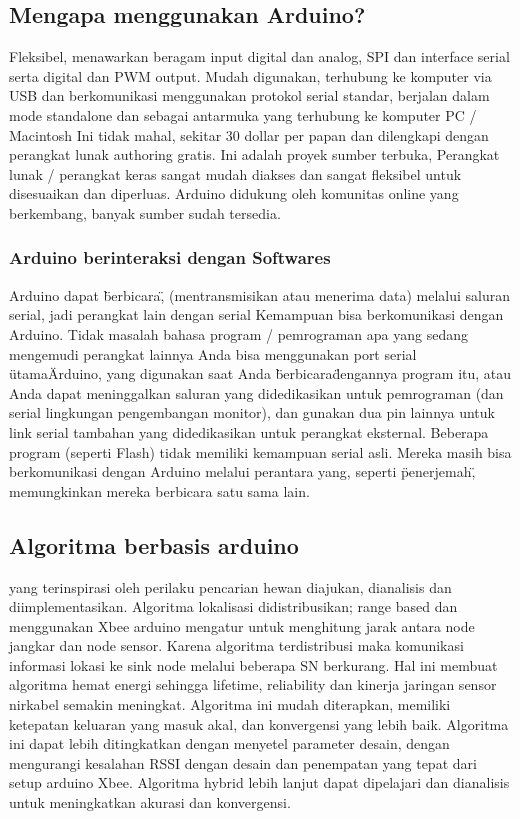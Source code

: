 \subsection{Mengapa menggunakan Arduino?}
Fleksibel, menawarkan beragam input digital dan analog, SPI dan interface serial serta digital dan PWM
output. Mudah digunakan, terhubung ke komputer via USB dan berkomunikasi menggunakan protokol serial standar, berjalan
dalam mode standalone dan sebagai antarmuka yang terhubung ke komputer PC / Macintosh
Ini tidak mahal, sekitar 30 dollar per papan dan dilengkapi dengan perangkat lunak authoring gratis. Ini adalah proyek sumber terbuka,
Perangkat lunak / perangkat keras sangat mudah diakses dan sangat fleksibel untuk disesuaikan dan diperluas. Arduino didukung
oleh komunitas online yang berkembang, banyak sumber sudah tersedia.

\subsubsection{Arduino berinteraksi dengan Softwares}
Arduino dapat \"berbicara\", (mentransmisikan atau menerima data) melalui saluran serial, jadi perangkat lain dengan serial
Kemampuan bisa berkomunikasi dengan Arduino. Tidak masalah bahasa program / pemrograman apa yang sedang mengemudi
perangkat lainnya Anda bisa menggunakan port serial \"utama\" Arduino, yang digunakan saat Anda \"berbicara\" dengannya
program itu, atau Anda dapat meninggalkan saluran yang didedikasikan untuk pemrograman (dan serial lingkungan pengembangan
monitor), dan gunakan dua pin lainnya untuk link serial tambahan yang didedikasikan untuk perangkat eksternal. Beberapa program (seperti
Flash) tidak memiliki kemampuan serial asli. Mereka masih bisa berkomunikasi dengan Arduino melalui perantara
yang, seperti \"penerjemah\", memungkinkan mereka berbicara satu sama lain.

\subsection{Algoritma berbasis arduino} 
yang terinspirasi oleh perilaku pencarian hewan diajukan, dianalisis dan diimplementasikan. Algoritma lokalisasi didistribusikan; range based dan menggunakan Xbee arduino mengatur untuk menghitung jarak antara node jangkar dan node sensor. Karena algoritma terdistribusi maka komunikasi informasi lokasi ke sink node melalui beberapa SN berkurang. Hal ini membuat algoritma hemat energi sehingga lifetime, reliability dan kinerja jaringan sensor nirkabel semakin meningkat. Algoritma ini mudah diterapkan, memiliki ketepatan keluaran yang masuk akal, dan konvergensi yang lebih baik. Algoritma ini dapat lebih ditingkatkan dengan menyetel parameter desain, dengan mengurangi kesalahan RSSI dengan desain dan penempatan yang tepat dari setup arduino Xbee. Algoritma hybrid lebih lanjut dapat dipelajari dan dianalisis untuk meningkatkan akurasi dan konvergensi.

